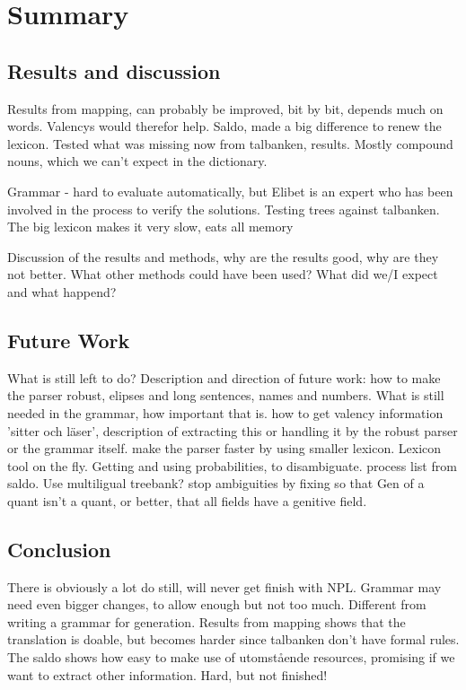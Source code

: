 \documentclass{report}
\begin{document}


\chapter{Summary}
\section{Results and discussion}
Results from mapping, can probably be improved, bit by bit, depends much on words.
Valencys would therefor help.  
Saldo, made a big difference to renew the lexicon. Tested what was missing now from talbanken,
results. Mostly compound nouns, which we can't expect in the dictionary.

Grammar - hard to evaluate automatically, but Elibet is an expert who has been involved
in the process to verify the solutions. Testing trees against talbanken.
The big lexicon makes it very slow, eats all memory

Discussion of the results and methods, why are the results good, why are they not better.
What other methods could have been used? What did we/I expect and what happend?


\section{Future Work}
What is still left to do? Description and direction of future work:
how to make the parser robust, elipses and long sentences, names and numbers.
What is still needed in the grammar, how important that is. 
how to get valency information 'sitter och läser', description of extracting this
or handling it by the robust parser or the grammar itself.
make the parser faster by using smaller lexicon.
Lexicon tool on the fly.
Getting and using probabilities, to disambiguate.
process list from saldo.
Use multiligual treebank?
stop ambiguities by fixing so that Gen of a quant isn't a quant, or better, that all fields
have a genitive field.


\section{Conclusion}
There is obviously a lot do still, will never get finish with NPL.
Grammar may need even bigger changes, to allow enough but not too much.
Different from writing a grammar for generation.
Results from mapping shows that the translation is doable, but becomes harder
since talbanken don't have formal rules.
The saldo shows how easy to make use of utomstående resources, promising if
we want to extract other information. 
Hard, but not finished! 
\end{document}
